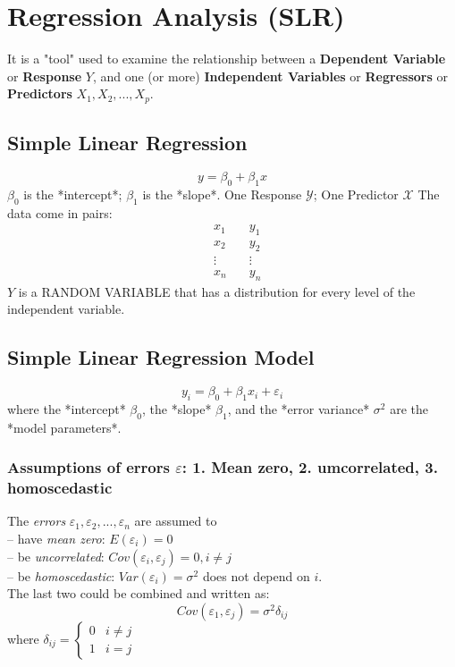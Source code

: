 \documentclass[11pt,a4paper]{article}
\begin{document}
\section{Regression Analysis (SLR)}
It is a "tool" used to examine the relationship between
a \textbf{Dependent Variable} or \textbf{Response} $Y$, and
one (or more) \textbf{Independent Variables} or \textbf{Regressors} or \textbf{Predictors} $X_1 ,X_2 ,...,X_p$.

\subsection{Simple Linear Regression}
$$y=\beta_0+\beta_1 x$$
$\beta_0$ is the *intercept*; $\beta_1$ is the *slope*.
One Response $\mathcal{Y}$; One Predictor $\mathcal{X}$
The data come in pairs:
$$\begin{aligned}
&x_1\quad &y_1\\&x_2\quad &y_2\\&\vdots\quad &\vdots\\&x_n\quad &y_n
\end{aligned}$$
$Y$ is a RANDOM VARIABLE that has a distribution for every level of the independent variable.

\subsection{Simple Linear Regression Model}
$$y_i=\beta_0+\beta_1 x_i+\varepsilon_i $$
where the *intercept* $\beta_0$, the *slope* $\beta_1$, and the *error variance* $\sigma^2$ are the *model parameters*.

\subsubsection{Assumptions of errors $\varepsilon$: 1. Mean zero, 2. umcorrelated, 3. homoscedastic}
The \textit{errors} $\varepsilon_1 , \varepsilon_2 , . . . , \varepsilon_n$ are assumed to\\
– have \textit{mean zero}: $E(\varepsilon_i ) = 0$\\
– be \textit{uncorrelated}: $Cov(\varepsilon_ i , \varepsilon_ j ) = 0, i \neq j$\\
– be \textit{homoscedastic}: $Var(\varepsilon_i ) = \sigma^ 2$ does not depend on $i$.\\

The last two could be combined and written as:
$$Cov(\varepsilon_1,\varepsilon_j)=\sigma^2\delta_{ij}$$
where $\delta_{ij}=\left\{\begin{matrix}
    0&i\neq j\\
    1&i=j
\end{matrix}\right.$
\end{document}

